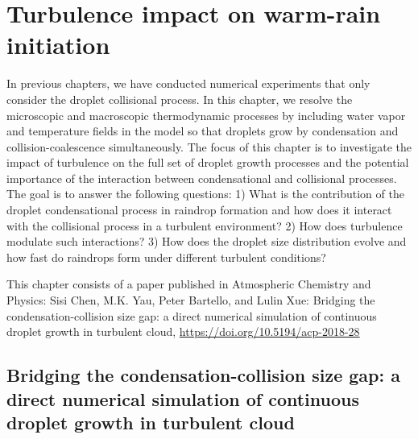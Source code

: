 \resetdatestamp

\chapter{Turbulence impact on warm-rain initiation}\label{sec:ch4}

In previous chapters, we have conducted numerical experiments that only consider the droplet collisional process. In this chapter, we resolve the microscopic and macroscopic thermodynamic processes by including water vapor and temperature fields in the model so that droplets grow by condensation and collision-coalescence simultaneously. The focus of this chapter is to investigate the impact of turbulence on the full set of droplet growth processes and the potential importance of the interaction between condensational and collisional processes. The goal is to answer the following questions:  1) What is the contribution of the droplet condensational process in raindrop formation and how does it interact with the collisional process in a turbulent environment? 2) How does turbulence modulate such interactions? 3) How does the droplet size distribution evolve and how fast do raindrops form under different turbulent conditions? 

This chapter consists of a paper published in Atmospheric Chemistry and Physics: Sisi Chen, M.K. Yau, Peter Bartello, and Lulin Xue: Bridging the condensation-collision size gap: a direct numerical simulation of continuous droplet growth in turbulent cloud, \url{https://doi.org/10.5194/acp-2018-28}
\newpage

\section*{\centering Bridging the condensation-collision size gap: a direct numerical simulation of continuous droplet growth in turbulent cloud}
\begin{center}
\author{Sisi Chen, M. K. Yau, Peter Bartello \\ \textit{Department of Atmospheric and Oceanic Sciences, McGill University, Montr\'{e}al, Qu\'{e}bec, Canada}\\}
\author{Lulin Xue \\ \textit{National Center for Atmospheric Research, Boulder, Colorado, USA}}

\end{center}

